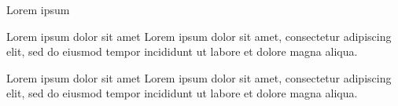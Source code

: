 \documentclass[sans]{resume}
\begin{document}
\begin{other}{Lorem ipsum}

\begin{otheritem}{Lorem ipsum dolor sit amet}
Lorem ipsum dolor sit amet, consectetur adipiscing elit, sed do eiusmod tempor incididunt ut labore et dolore magna aliqua.
\end{otheritem}

\begin{otheritem}{Lorem ipsum dolor sit amet}
Lorem ipsum dolor sit amet, consectetur adipiscing elit, sed do eiusmod tempor incididunt ut labore et dolore magna aliqua.
\end{otheritem}

\end{other}
\end{document}
